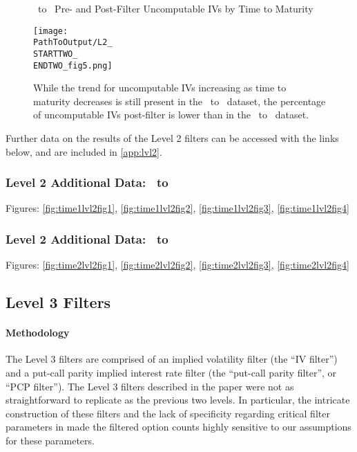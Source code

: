 \begin{figure}[H] %
  \centering
  \caption{\STARTTWO\ to \ENDTWO\ Pre- and Post-Filter Uncomputable IVs by Time to Maturity}
  \texttt{[image: \\PathToOutput/L2\_\\STARTTWO\_\\ENDTWO\_fig5.png]}
  \caption*{While the trend for uncomputable IVs increasing as time to maturity decreases is still present in the \STARTTWO\ to \ENDTWO\ dataset, the percentage of uncomputable IVs post-filter is lower than in the \STARTONE\ to \ENDONE\ dataset.}
 \label{fig:time2lvl2fig5}
\end{figure}

Further data on the results of the Level 2 filters can be accessed with the links below, and are included in \autoref{app:lvl2}.

\subsubsection{Level 2 Additional Data: \STARTONE\ to \ENDONE }
Figures: \autoref{fig:time1lvl2fig1}, \autoref{fig:time1lvl2fig2}, \autoref{fig:time1lvl2fig3}, \autoref{fig:time1lvl2fig4}

\subsubsection{Level 2 Additional Data: \STARTTWO\ to \ENDTWO }
Figures: \autoref{fig:time2lvl2fig1}, \autoref{fig:time2lvl2fig2}, \autoref{fig:time2lvl2fig3}, \autoref{fig:time2lvl2fig4}


\clearpage
\subsection{Level 3 Filters} 

\paragraph{Methodology}
The Level 3 filters are comprised of an implied volatility filter (the ``IV filter'') and a put-call parity implied interest rate filter (the ``put-call parity filter'', or ``PCP filter''). The Level 3 filters described in the paper were not as straightforward to replicate as the previous two levels. In particular, the intricate construction of these filters and the lack of specificity regarding critical filter parameters in \citet{constantinides2013} made the filtered option counts highly sensitive to our assumptions for these parameters. 


